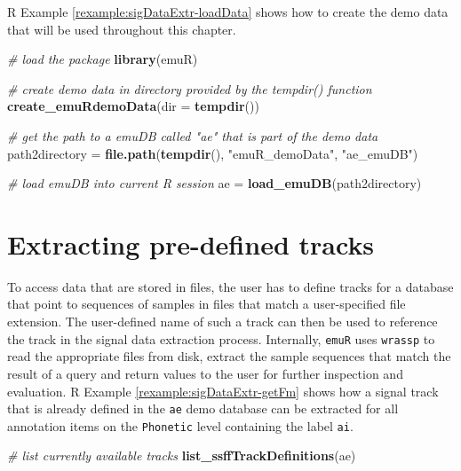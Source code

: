 \documentclass[]{book}
\newenvironment{Shaded}{\begin{snugshade}}{\end{snugshade}}
\newcommand{\CommentTok}[1]{\textcolor[rgb]{0.56,0.35,0.01}{\textit{#1}}}
\newcommand{\DataTypeTok}[1]{\textcolor[rgb]{0.13,0.29,0.53}{#1}}
\newcommand{\KeywordTok}[1]{\textcolor[rgb]{0.13,0.29,0.53}{\textbf{#1}}}
\newcommand{\NormalTok}[1]{#1}
\newcommand{\StringTok}[1]{\textcolor[rgb]{0.31,0.60,0.02}{#1}}
\theoremstyle{definition}
\theoremstyle{definition}
\theoremstyle{definition}
\theoremstyle{remark}
\begin{document}
R Example \ref{rexample:sigDataExtr-loadData} shows how to create the
demo data that will be used throughout this chapter.

\begin{Shaded}
\begin{Highlighting}[]
\CommentTok{# load the package}
\KeywordTok{library}\NormalTok{(emuR)}

\CommentTok{# create demo data in directory provided by the tempdir() function}
\KeywordTok{create_emuRdemoData}\NormalTok{(}\DataTypeTok{dir =} \KeywordTok{tempdir}\NormalTok{())}

\CommentTok{# get the path to a emuDB called "ae" that is part of the demo data}
\NormalTok{path2directory =}\StringTok{ }\KeywordTok{file.path}\NormalTok{(}\KeywordTok{tempdir}\NormalTok{(), }\StringTok{"emuR_demoData"}\NormalTok{, }\StringTok{"ae_emuDB"}\NormalTok{)}

\CommentTok{# load emuDB into current R session}
\NormalTok{ae =}\StringTok{ }\KeywordTok{load_emuDB}\NormalTok{(path2directory)}
\end{Highlighting}
\end{Shaded}

\hypertarget{extracting-pre-defined-tracks}{%
\section{Extracting pre-defined
tracks}\label{extracting-pre-defined-tracks}}

To access data that are stored in files, the user has to define tracks
for a database that point to sequences of samples in files that match a
user-specified file extension. The user-defined name of such a track can
then be used to reference the track in the signal data extraction
process. Internally, \texttt{emuR} uses \texttt{wrassp} to read the
appropriate files from disk, extract the sample sequences that match the
result of a query and return values to the user for further inspection
and evaluation. R Example \ref{rexample:sigDataExtr-getFm} shows how a
signal track that is already defined in the \texttt{ae} demo database
can be extracted for all annotation items on the \texttt{Phonetic} level
containing the label \texttt{ai}.

\begin{Shaded}
\begin{Highlighting}[]
\CommentTok{# list currently available tracks}
\KeywordTok{list_ssffTrackDefinitions}\NormalTok{(ae)}
\end{Highlighting}
\end{Shaded}
\end{document}
